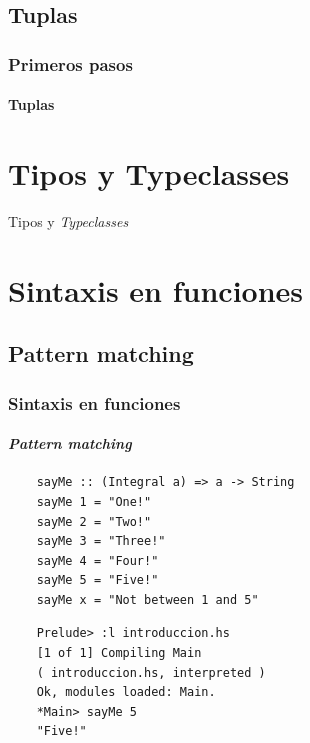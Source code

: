 \documentclass{beamer}
\begin{document}
\subsection{Tuplas}
\begin{frame}[fragile]
  \frametitle{Primeros pasos}
  \framesubtitle{Tuplas}
\end{frame}

\section{Tipos y Typeclasses}
\begin{frame}{Tipos y \emph{Typeclasses}}      %

\end{frame}

\section{Sintaxis en funciones}
\subsection{Pattern matching}
\begin{frame}[fragile]
  \frametitle{Sintaxis en funciones}
  \framesubtitle{\emph{Pattern matching}}
  \begin{verbatim}
    sayMe :: (Integral a) => a -> String
    sayMe 1 = "One!"
    sayMe 2 = "Two!"
    sayMe 3 = "Three!"
    sayMe 4 = "Four!"
    sayMe 5 = "Five!"
    sayMe x = "Not between 1 and 5"
  \end{verbatim}

  \begin{verbatim}
    Prelude> :l introduccion.hs
    [1 of 1] Compiling Main
    ( introduccion.hs, interpreted )
    Ok, modules loaded: Main.
    *Main> sayMe 5
    "Five!"
  \end{verbatim}
\end{frame}
\end{document}
